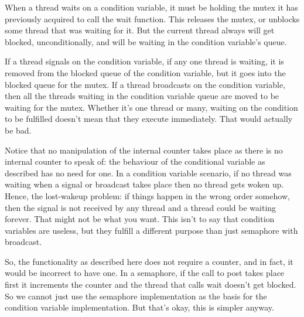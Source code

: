 When a thread waits on a condition variable, it must be holding the mutex it has previously acquired to call the wait function. This releases the mutex, or unblocks some thread that was waiting for it. But the current thread always will get blocked, unconditionally, and will be waiting in the condition variable's queue.

If a thread signals on the condition variable, if any one thread is waiting, it is removed from the blocked queue of the condition variable, but it goes into the blocked queue for the mutex. If a thread broadcasts on the condition variable, then all the threads waiting in the condition variable queue are moved to be waiting for the mutex. Whether it's one thread or many, waiting on the condition to be fulfilled doesn't mean that they execute immediately. That would actually be bad.

Notice that no manipulation of the internal counter takes place as there is no internal counter to speak of: the behaviour of the conditional variable as described has no need for one. In a condition variable scenario, if no thread was waiting when a signal or broadcast takes place then no thread gets woken up. Hence, the lost-wakeup problem: if things happen in the wrong order somehow, then the signal is not received by any thread and a thread could be waiting forever. That might not be what you want. This isn't to say that condition variables are useless, but they fulfill a different purpose than just semaphore with broadcast.

So, the functionality as described here does not require a counter, and in fact, it would be incorrect to have one. In a semaphore, if the call to post takes place first it increments the counter and the thread that calls wait doesn't get blocked. So we cannot just use the semaphore implementation as the basis for the condition variable implementation. But that's okay, this is simpler anyway.




